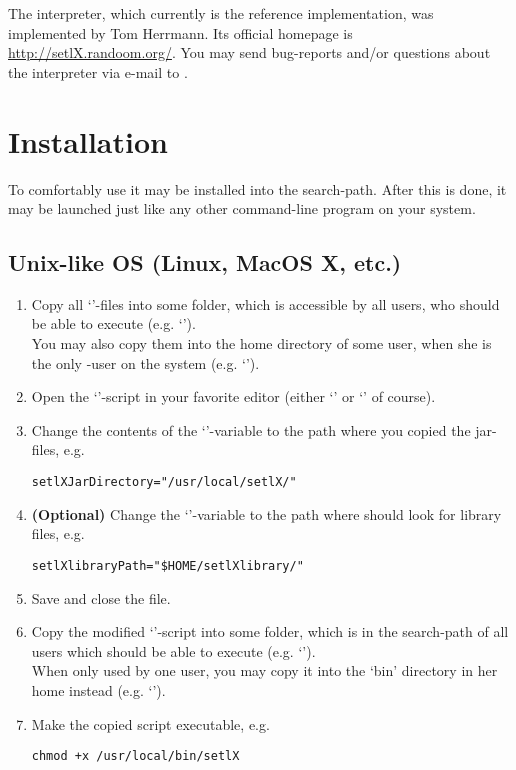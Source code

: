 The \setlX{} interpreter, which currently is the \SetlX{} reference implementation, was implemented by Tom Herrmann. Its official homepage is \url{http://setlX.randoom.org/}. You may send bug-reports and\slash{}or questions about the \setlX{} interpreter via e-mail to .


\section{Installation}

To comfortably use \setlX{} it may be installed into the search-path. After this is done, it may be launched just like any other command-line program on your system.

\subsection{Unix-like OS (Linux, MacOS X, etc.)}\label{Unix}

\begin{enumerate}
	\item Copy all `'-files into some folder, which is accessible by all users, who should be able to execute \setlX{} (e.g. `').\\
	You may also copy them into the home directory of some user, when she is the only \setlX-user on the system (e.g. `').
	\item Open the `'-script in your favorite editor (either `' or `' of course).
	\item Change the contents of the `'-variable to the path where you copied the jar-files, e.g.
\begin{lstlisting}[frame=none,numbers=none]
setlXJarDirectory="/usr/local/setlX/"
\end{lstlisting}
	\item \textbf{(Optional)} Change the `'-variable to the path where \setlX{} should look for library files, e.g.
\begin{lstlisting}[frame=none,numbers=none]
setlXlibraryPath="$HOME/setlXlibrary/"
\end{lstlisting}
	\item Save and close the file.
	\item Copy the modified `'-script into some folder, which is in the search-path of all users which should be able to execute \setlX{} (e.g. `').\\
	When only used by one user, you may copy it into the `bin' directory in her home instead (e.g. `').
	\item Make the copied script executable, e.g.
\begin{lstlisting}[frame=none,numbers=none]
chmod +x /usr/local/bin/setlX
\end{lstlisting}
	
\end{enumerate}

